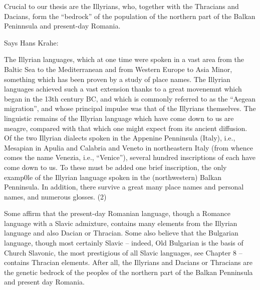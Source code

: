 Crucial to our thesis are the Illyrians, who, together with the Thracians and Dacians, form the ``bedrock'' of the population of the northern part of the Balkan Peninnsula and present-day Romania.

Says Hans Krahe:

\begin{quotex}
The Illyrian languages, which at one time were spoken in a vast area from the Baltic Sea to the Mediterranean and from Western Europe to Asia Minor, something which has been proven by a study of place names. The Illyrian languages achieved such a vast extension thanks to a great movenemnt which began in the 13th century BC, and which is commonly referred to as the ``Aegean migration'', and whose principal impulse was that of the Illyrians themselves. The linguistic remains of the Illyrian language which have come down to us are meagre, compared with that which one might expect from its ancient diffusion. Of the two Illyrian dialects spoken in the Appenine Penninsula (Italy), i.e., Mesapian in Apulia and Calabria and Veneto in northeastern Italy (from whence comes the name Venezia, i.e., ``Venice''), several hundred inscriptions of each have come down to us. To these must be added one brief inscription, the only examp0le of the Illyrian language spoken in the (northwestern) Balkan Penninsula. In addition, there survive a great many place names and personal names, and numerous glosses. (2)
\end{quotex}

Some affirm that the present-day Romanian language, though a Romance language with a Slavic admixture, contains many elements from the Illyrian language and also Dacian or Thracian. Some also believe that the Bulgarian language, though most certainly Slavic -- indeed, Old Bulgarian is the basis of Church Slavonic, the most prestigious of all Slavic languages, see Chapter 8 -- contains Thracian elements. After all, the Illyrians and Dacians or Thracians are the genetic bedrock of the peoples of the northern part of the Balkan Penninsula and present day Romania.



